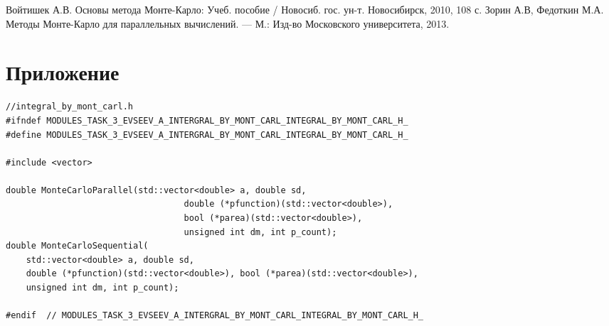 \documentclass{report}
\begin{document}
\begin{thebibliography}{1}
 Войтишек А.В. Основы метода Монте-Карло: Учеб. пособие / Новосиб. гос. ун-т. Новосибирск, 2010, 108 с. 
 Зорин А.В, Федоткин М.А. Методы Монте-Карло для параллельных вычислений. — М.: Изд-во Московского университета, 2013.
\end{thebibliography}
\newpage

\section*{Приложение}


\begin{lstlisting}
//integral_by_mont_carl.h
#ifndef MODULES_TASK_3_EVSEEV_A_INTERGRAL_BY_MONT_CARL_INTEGRAL_BY_MONT_CARL_H_
#define MODULES_TASK_3_EVSEEV_A_INTERGRAL_BY_MONT_CARL_INTEGRAL_BY_MONT_CARL_H_

#include <vector>

double MonteCarloParallel(std::vector<double> a, double sd,
                                   double (*pfunction)(std::vector<double>),
                                   bool (*parea)(std::vector<double>),
                                   unsigned int dm, int p_count);
double MonteCarloSequential(
    std::vector<double> a, double sd,
    double (*pfunction)(std::vector<double>), bool (*parea)(std::vector<double>),
    unsigned int dm, int p_count);

#endif  // MODULES_TASK_3_EVSEEV_A_INTERGRAL_BY_MONT_CARL_INTEGRAL_BY_MONT_CARL_H_
\end{lstlisting}
\end{document}
